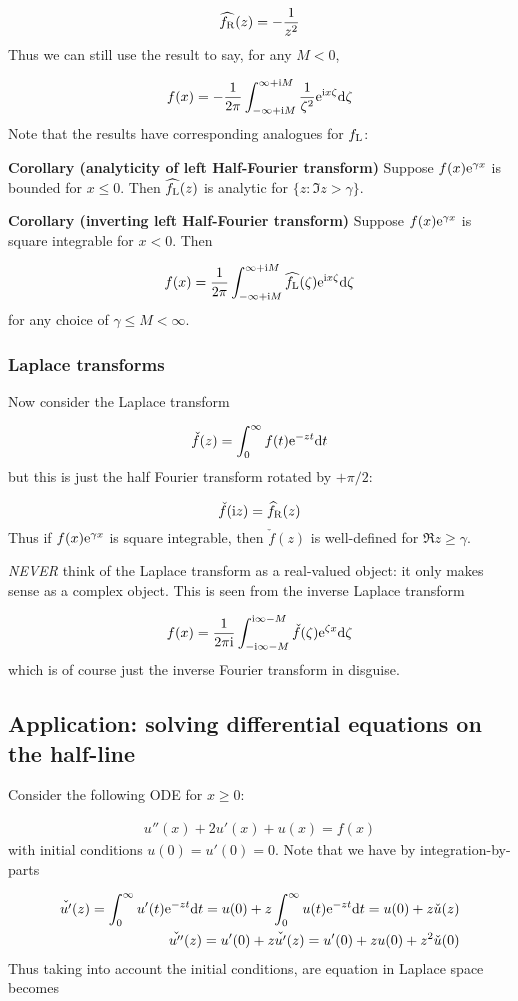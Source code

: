 \documentclass[12pt,landscape]{article}
\def\D{ {\rm d} }
\def\I{ {\rm i} }
\def\E{ {\rm e} }
\def\fR{ f_{\rm R} }
\def\fL{ f_{\rm L} }
\def\dt{\D t}
\begin{document}
{\[
\widehat{\fR}(z) = -{1 \over z^2}
\]
Thus we can still use the result to say, for any $M < 0$,

\[
f(x) =-{1 \over 2 \pi} \int_{-\infty+\I M}^{\infty +\I M} {1 \over \zeta^2} \E^{\I x \zeta}\D \zeta
\]
\newpage
Note that the results have corresponding analogues for $\fL$:

\textbf{Corollary (analyticity of left Half-Fourier transform)} Suppose $f(x) \E^{\gamma x}$  is bounded for $x \leq 0$. Then $\widehat{\fL}(z)$ is analytic for $\{z : \Im z > \gamma \}$.

\textbf{Corollary  (inverting left Half-Fourier transform)} Suppose $f(x) \E^{\gamma x}$ is square integrable for $x < 0$. Then

\[
f(x) = {1 \over 2 \pi} \int_{-\infty + \I M}^{\infty + \I M} \widehat{\fL}(\zeta) \E^{\I x \zeta} \D \zeta
\]
for any choice of $\gamma \leq M < \infty$.
\newpage
\subsubsection{Laplace transforms}
Now consider the Laplace transform

\[
\check f(z) = \int_0^\infty f(t) \E^{-z t} \dt
\]
but this is just the half Fourier transform rotated by $+\pi/2$:

\[
\check f(\I z) = \widehat\fR (z)
\]
Thus if $f(x) \E^{\gamma x}$ is square integrable, then $\check f(z)$ is well-defined for $\Re z \geq \gamma$.

\emph{NEVER} think of the Laplace transform as a real-valued object: it only makes sense as a complex object. This is seen from the inverse Laplace transform

\[
f(x) = {1 \over 2 \pi \I} \int_{-\I \infty - M}^{\I \infty - M}  \check f(\zeta) \E^{\zeta x} \D \zeta
\]
which is of course just the inverse Fourier transform in disguise.
\newpage
\subsection{Application: solving differential equations on the half-line}
Consider the following ODE for $x \geq 0$:


\begin{align*}
u''(x) + 2u'(x) + u(x) = f(x)
\end{align*}
with initial conditions $u(0) = u'(0) = 0$. Note that we have by integration-by-parts


\begin{align*}
\check{u'}(z) = \int_0^\infty u'(t) \E^{-z t} \dt = u(0) + z \int_0^\infty u(t) \E^{-z t} \dt = u(0) + z \check u(z) \\
\check{u''}(z) = u'(0) + z \check{u'}(z) = u'(0) + z u(0) + z^2 \check u(0)
\end{align*}
Thus taking into account the initial conditions, are equation in Laplace space becomes

}
\end{document}
